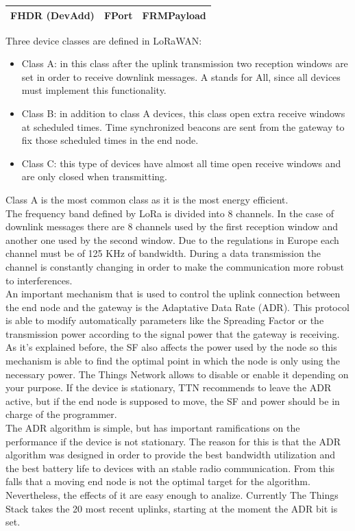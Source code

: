 \begin{center}
\begin{tabular}{ |c|c|c| } 
    \hline
    FHDR (DevAdd) & FPort & FRMPayload \\ 
    \hline
\end{tabular}
\end{center}

Three device classes are defined in LoRaWAN:
\begin{itemize}
    \item Class A: in this class after the uplink transmission two reception
windows are set in order to receive downlink messages. A stands
for All, since all devices must implement this functionality.
    \item Class B: in addition to class A devices, this class open extra
receive windows at scheduled times. Time synchronized beacons
are sent from the gateway to fix those scheduled times in the end
node.
    \item Class C: this type of devices have almost all time open receive
windows and are only closed when transmitting.
\end{itemize}
Class A is the most common class as it is the most energy efficient.\\
The frequency band defined by LoRa is divided into 8 channels. In the
case of downlink messages there are 8 channels used by the first
reception window and another one used by the second window. Due to
the regulations in Europe each channel must be of 125 KHz of
bandwidth. During a data transmission the channel is constantly
changing in order to make the communication more robust to
interferences.\\
An important mechanism that is used to control the uplink connection
between the end node and the gateway is the Adaptative Data Rate
(ADR). This protocol is able to modify automatically parameters like the
Spreading Factor or the transmission power according to the signal
power that the gateway is receiving. As it's explained before, the SF also
affects the power used by the node so this mechanism is able to find the
optimal point in which the node is only using the necessary power. The
Things Network allows to disable or enable it depending on your
purpose. If the device is stationary, TTN recommends to leave the ADR
active, but if the end node is supposed to move, the SF and power
should be in charge of the programmer.\\
The ADR algorithm is simple, but has important ramifications on 
the performance if the device is not stationary.
The reason for this is that the ADR algorithm was designed in order
to provide the best bandwidth utilization and the best battery life
to devices with an stable radio communication. From this falls that 
a moving end node is not the optimal target for the algorithm. Nevertheless, 
the effects of it are easy enough to analize. 
Currently The Things Stack takes the 20 most recent uplinks, 
starting at the moment the ADR bit is set. 

